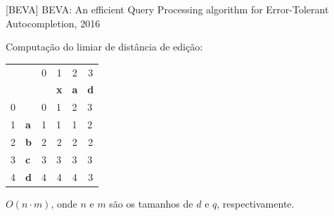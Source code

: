 \documentclass[11pt]{beamer}
\begin{document}
\begin{frame}{[BEVA] BEVA: An efficient Query Processing algorithm for Error-Tolerant Autocompletion, 2016}

    Computação do limiar de distância de edição:
  
    \begin{table}[]
    \begin{tabular}{llllll}
     &  & \multicolumn{1}{c}{{\color[HTML]{656565} 0}} & \multicolumn{1}{c}{{\color[HTML]{656565} 1}} & \multicolumn{1}{c}{{\color[HTML]{656565} 2}} & \multicolumn{1}{c}{{\color[HTML]{656565} 3}} \\
     &  &  & \textbf{x} & \textbf{a} & \textbf{d} \\ \cline{3-6} 
    {\color[HTML]{656565} 0} & \multicolumn{1}{l|}{} & \multicolumn{1}{l|}{{\color[HTML]{000000} 0}} & \multicolumn{1}{l|}{{\color[HTML]{000000} 1}} & \multicolumn{1}{l|}{{\color[HTML]{000000} 2}} & \multicolumn{1}{l|}{{\color[HTML]{000000} 3}} \\ \cline{3-6} 
    {\color[HTML]{656565} 1} & \multicolumn{1}{l|}{\textbf{a}} & \multicolumn{1}{l|}{{\color[HTML]{000000} 1}} & \multicolumn{1}{l|}{{\color[HTML]{000000} 1}} & \multicolumn{1}{l|}{{\color[HTML]{000000} 1}} & \multicolumn{1}{l|}{{\color[HTML]{000000} 2}} \\ \cline{3-6} 
    {\color[HTML]{656565} 2} & \multicolumn{1}{l|}{\textbf{b}} & \multicolumn{1}{c|}{{\color[HTML]{000000} 2}} & \multicolumn{1}{c|}{{\color[HTML]{000000} 2}} & \multicolumn{1}{c|}{{\color[HTML]{000000} 2}} & \multicolumn{1}{c|}{{\color[HTML]{000000} 2}} \\ \cline{3-6} 
    {\color[HTML]{656565} 3} & \multicolumn{1}{l|}{\textbf{c}} & \multicolumn{1}{l|}{{\color[HTML]{000000} 3}} & \multicolumn{1}{l|}{{\color[HTML]{000000} 3}} & \multicolumn{1}{l|}{{\color[HTML]{000000} 3}} & \multicolumn{1}{l|}{{\color[HTML]{000000} 3}} \\ \cline{3-6} 
    {\color[HTML]{656565} 4} & \multicolumn{1}{l|}{\textbf{d}} & \multicolumn{1}{c|}{{\color[HTML]{000000} 4}} & \multicolumn{1}{c|}{{\color[HTML]{000000} 4}} & \multicolumn{1}{c|}{{\color[HTML]{000000} 4}} & \multicolumn{1}{c|}{{\color[HTML]{000000} 3}} \\ \cline{3-6} 
    \end{tabular}
    \end{table}
    
    $O(n \cdot m)$, onde $n$ e $m$ são os tamanhos de $d$ e $q$, respectivamente.
    
\end{frame}
\end{document}
